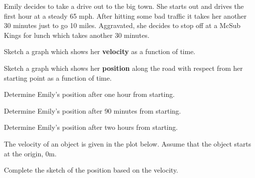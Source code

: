 \begin{problem}
\item Emily decides to take a drive out to the big town. She starts
  out and drives the first hour at a steady 65 mph. After hitting some
  bad traffic it takes her another 30 minutes just to go 10
  miles. Aggravated, she decides to stop off at a McSub Kings for
  lunch which takes another 30 minutes. 


  \begin{subproblem}
  \item Sketch a graph which shows her \textbf{velocity} as a function
    of time.


      \vfill

    \item Sketch a graph which shows her \textbf{position} along the
      road with respect from her starting point as a function of time.


    \vfill

    \item Determine Emily's position after one hour from starting.
      \vspace{3em}

    \item Determine Emily's position after 90 minutes from starting.
      \vspace{3em}

    \item Determine Emily's position after two hours from starting.
      \vspace{3em}


  \end{subproblem}


  \clearpage

\item The velocity of an object is given in the plot below.  Assume
  that the object starts at the origin, 0m.

  \begin{subproblem}
  \item Complete the sketch of the position based on the velocity.


\end{subproblem}
\end{problem}
